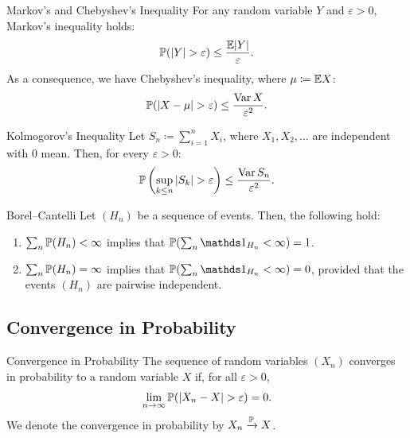 \begin{prop}{Markov's and Chebyshev's Inequality}{}
	For any random variable \(Y\) and \(\varepsilon > 0\), Markov's inequality holds:
	\begin{equation}
		\mathbb{P}(|Y| > \varepsilon) \le \frac{\mathbb{E}|Y|}{\varepsilon}.
		\label{eq:MarkovsInequality}
	\end{equation}
	As a consequence, we have Chebyshev's inequality, where \(\mu \coloneqq \mathbb{E} X\):
	\begin{equation}
		\mathbb{P}(|X - \mu| > \varepsilon) \le \frac{\operatorname{Var} X}{\varepsilon^2}.
		\label{eq:ChebyshevsInequality}
	\end{equation}
\end{prop}

\begin{thm}{Kolmogorov's Inequality}{}
	Let \(S_n \coloneqq \sum_{i=1}^n X_i\), where \(X_1, X_2, \dots\) are independent with \(0\) mean. Then, for every \(\varepsilon > 0\):
	\begin{equation}
		\mathbb{P} \left( \sup_{k \le n} |S_k| > \varepsilon \right) \le \frac{\operatorname{Var} S_n}{\varepsilon^2}.
		\label{eq:KolmogorovsInequality}
	\end{equation}
\end{thm}

\begin{lem}{Borel--Cantelli}{}
	Let \((H_n)\) be a sequence of events. Then, the following hold:
	\begin{enumerate}
		\item \(\sum_n \mathbb{P}(H_n) < \infty\) implies that \(\Prob(\sum_n \I_{H_n} < \infty) = 1\).
		\item \(\sum_n \mathbb{P}(H_n) = \infty\) implies that \(\Prob(\sum_n \I_{H_n} < \infty) = 0\), provided that the events \((H_n)\) are pairwise independent.
	\end{enumerate}
\end{lem}

\subsection{Convergence in Probability}

\begin{defn}{Convergence in Probability}{}
	The sequence of random variables \((X_n)\) converges in probability to a random variable \(X\) if, for all \(\varepsilon > 0\),
	\begin{equation*}
		\lim_{n \to \infty} \mathbb{P}(|X_n - X| > \varepsilon) = 0.
	\end{equation*}
	We denote the convergence in probability by \(X_n \xrightarrow{\mathbb{P}} X\).
\end{defn}


